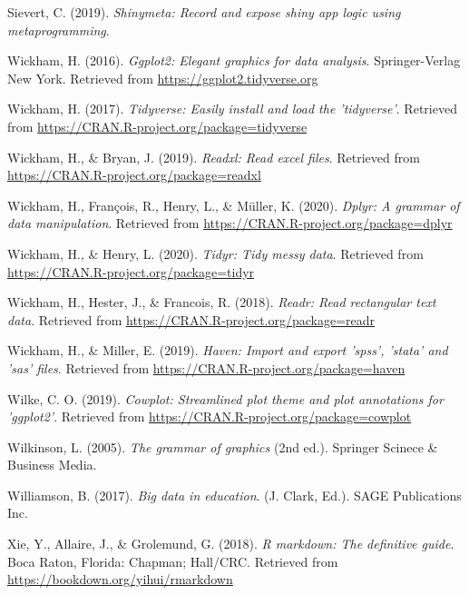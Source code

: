 \documentclass[english,man,floatsintext]{apa6}
\begin{document}
\leavevmode\hypertarget{ref-R-shinymeta}{}%
Sievert, C. (2019). \emph{Shinymeta: Record and expose shiny app logic using metaprogramming}.

\leavevmode\hypertarget{ref-R-ggplot2}{}%
Wickham, H. (2016). \emph{Ggplot2: Elegant graphics for data analysis}. Springer-Verlag New York. Retrieved from \url{https://ggplot2.tidyverse.org}

\leavevmode\hypertarget{ref-tidyverse}{}%
Wickham, H. (2017). \emph{Tidyverse: Easily install and load the 'tidyverse'}. Retrieved from \url{https://CRAN.R-project.org/package=tidyverse}

\leavevmode\hypertarget{ref-R-readxl}{}%
Wickham, H., \& Bryan, J. (2019). \emph{Readxl: Read excel files}. Retrieved from \url{https://CRAN.R-project.org/package=readxl}

\leavevmode\hypertarget{ref-R-dplyr}{}%
Wickham, H., François, R., Henry, L., \& Müller, K. (2020). \emph{Dplyr: A grammar of data manipulation}. Retrieved from \url{https://CRAN.R-project.org/package=dplyr}

\leavevmode\hypertarget{ref-R-tidyr}{}%
Wickham, H., \& Henry, L. (2020). \emph{Tidyr: Tidy messy data}. Retrieved from \url{https://CRAN.R-project.org/package=tidyr}

\leavevmode\hypertarget{ref-R-readr}{}%
Wickham, H., Hester, J., \& Francois, R. (2018). \emph{Readr: Read rectangular text data}. Retrieved from \url{https://CRAN.R-project.org/package=readr}

\leavevmode\hypertarget{ref-R-haven}{}%
Wickham, H., \& Miller, E. (2019). \emph{Haven: Import and export 'spss', 'stata' and 'sas' files}. Retrieved from \url{https://CRAN.R-project.org/package=haven}

\leavevmode\hypertarget{ref-R-cowplot}{}%
Wilke, C. O. (2019). \emph{Cowplot: Streamlined plot theme and plot annotations for 'ggplot2'}. Retrieved from \url{https://CRAN.R-project.org/package=cowplot}

\leavevmode\hypertarget{ref-grammar}{}%
Wilkinson, L. (2005). \emph{The grammar of graphics} (2nd ed.). Springer Scinece \& Business Media.

\leavevmode\hypertarget{ref-bigdata2}{}%
Williamson, B. (2017). \emph{Big data in education}. (J. Clark, Ed.). SAGE Publications Inc.

\leavevmode\hypertarget{ref-R-rmarkdown}{}%
Xie, Y., Allaire, J., \& Grolemund, G. (2018). \emph{R markdown: The definitive guide}. Boca Raton, Florida: Chapman; Hall/CRC. Retrieved from \url{https://bookdown.org/yihui/rmarkdown}

\endgroup
\end{document}

